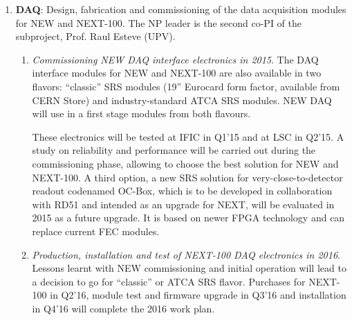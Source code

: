 \begin{enumerate}
\begin{enumerate}

\end{enumerate}
 
\item {\bf DAQ}: Design, fabrication and commissioning of the data acquisition modules for NEW and NEXT-100. The NP leader is the second co-PI of the subproject, Prof. Raul Esteve (UPV).

\begin{enumerate}

\item	{\em Commissioning NEW DAQ interface electronics in 2015}. The DAQ interface modules for NEW and NEXT-100 are also available in two flavors: “classic” SRS modules (19” Eurocard form factor, available from CERN Store) and industry-standard ATCA SRS modules. NEW DAQ will use in a first stage modules from both flavours.

These electronics will be tested at IFIC in Q1’15 and at LSC in Q2’15. A study on reliability and performance will be carried out during the commissioning phase, allowing to choose the best solution for NEW and NEXT-100. A third option, a new SRS solution for very-close-to-detector readout codenamed OC-Box, which is to be developed in collaboration with RD51 and intended as an upgrade for NEXT, will be evaluated in 2015 as a future upgrade. It is based on newer FPGA technology and can replace current FEC modules.

\item	{\em Production, installation and test of NEXT-100 DAQ electronics in 2016}. Lessons learnt with NEW commissioning and initial operation will lead to a decision to go for “classic” or ATCA SRS flavor. Purchases for NEXT-100 in Q2’16, module test and firmware upgrade in Q3’16 and installation in Q4’16 will complete the 2016 work plan.


\end{enumerate}
\end{enumerate}
